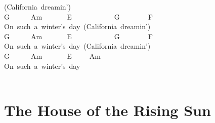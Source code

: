 \documentclass[]{book}
\let\stdsection\section
\renewcommand\section{\clearpage\stdsection}
\begin{document}
\hspace*{0.333em}\hspace*{0.333em}\hspace*{0.333em}\hspace*{0.333em}\hspace*{0.333em}\hspace*{0.333em}\hspace*{0.333em}\hspace*{0.333em}\hspace*{0.333em}\hspace*{0.333em}\hspace*{0.333em}\hspace*{0.333em}\hspace*{0.333em}\hspace*{0.333em}(California~dreamin')\\
\hspace*{0.333em}\hspace*{0.333em}\hspace*{0.333em}G~~~~~~Am~~~~~~~E~~~~~~~~~~~~G~~~~~~~~F\\
On~such~a~winter's~day~(California~dreamin')\\
\hspace*{0.333em}\hspace*{0.333em}\hspace*{0.333em}G~~~~~~Am~~~~~~~E~~~~~~~~~~~~G~~~~~~~~F\\
On~such~a~winter's~day~(California~dreamin')\\
\hspace*{0.333em}\hspace*{0.333em}\hspace*{0.333em}G~~~~~~Am~~~~~~~E~~~~~Am\\
On~such~a~winter's~day\\
~\\

\hypertarget{the-house-of-the-rising-sun}{%
\section{The House of the Rising Sun}\label{the-house-of-the-rising-sun}}
\end{document}
